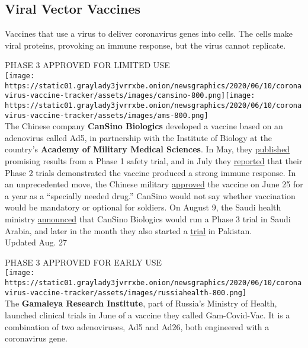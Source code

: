 \hypertarget{viral-vector-vaccines}{%
\subsection{Viral Vector Vaccines}\label{viral-vector-vaccines}}

Vaccines that use a virus to deliver coronavirus genes into cells. The
cells make viral proteins, provoking an immune response, but the virus
cannot replicate.

PHASE 3 APPROVED FOR LIMITED USE\\
\texttt{[image: https://static01.graylady3jvrrxbe.onion/newsgraphics/2020/06/10/coronavirus-vaccine-tracker/assets/images/cansino-800.png]}\texttt{[image: https://static01.graylady3jvrrxbe.onion/newsgraphics/2020/06/10/coronavirus-vaccine-tracker/assets/images/ams-800.png]}\\
The Chinese company \textbf{CanSino Biologics} developed a vaccine based
on an adenovirus called Ad5, in partnership with the Institute of
Biology at the country's \textbf{Academy of Military Medical Sciences}.
In May, they
\href{https://www.nytimes3xbfgragh.onion/2020/05/22/health/coronavirus-vaccine-china.html}{published}
promising results from a Phase 1 safety trial, and in July they
\href{https://www.thelancet.com/lancet/article/s0140-6736(20)31605-6}{reported}
that their Phase 2 trials demonstrated the vaccine produced a strong
immune response. In an unprecedented move, the Chinese military
\href{https://www.nytimes3xbfgragh.onion/2020/07/16/business/china-vaccine-coronavirus.html}{approved}
the vaccine on June 25 for a year as a ``specially needed drug.''
CanSino would not say whether vaccination would be mandatory or optional
for soldiers. On August 9, the Saudi health ministry
\href{https://www.arabnews.com/node/1717041/saudi-arabia}{announced}
that CanSino Biologics would run a Phase 3 trial in Saudi Arabia, and
later in the month they also started a
\href{https://clinicaltrials.gov/ct2/show/NCT04526990?term=vaccine\&recrs=abdf\&cond=COVID-19\&phase=0123\&sort=nwst\&draw=2\&rank=1}{trial}
in Pakistan.\\
Updated Aug. 27

PHASE 3 APPROVED FOR EARLY USE\\
\texttt{[image: https://static01.graylady3jvrrxbe.onion/newsgraphics/2020/06/10/coronavirus-vaccine-tracker/assets/images/russiahealth-800.png]}\\
The \textbf{Gamaleya Research Institute}, part of Russia's Ministry of
Health, launched clinical trials in June of a vaccine they called
Gam-Covid-Vac. It is a combination of two adenoviruses, Ad5 and Ad26,
both engineered with a coronavirus gene.

